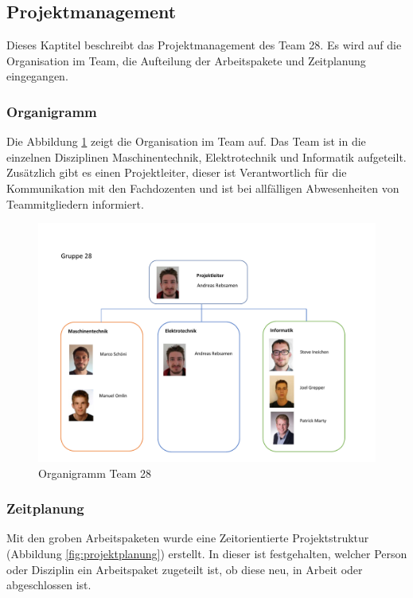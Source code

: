 \documentclass[../../main.tex]{subfiles}
\begin{document}
\subsection{Projektmanagement}
Dieses Kaptitel beschreibt das Projektmanagement des Team 28. Es wird auf die Organisation im Team, die Aufteilung der Arbeitspakete und Zeitplanung eingegangen.

\subsubsection{Organigramm}
Die Abbildung \ref{fig:organigramm} zeigt die Organisation im Team auf. Das Team ist in die einzelnen Disziplinen Maschinentechnik, Elektrotechnik und Informatik aufgeteilt. Zusätzlich gibt es einen Projektleiter, dieser ist Verantwortlich für die Kommunikation mit den Fachdozenten und ist bei allfälligen Abwesenheiten von Teammitgliedern informiert.


\begin{figure}[H] \centering
    \includegraphics[page=1,width=.9\textwidth, trim=1cm .5cm 1cm 3.2cm, clip]{Organigramm.pdf}
    \caption{Organigramm Team 28}
    \label{fig:organigramm}
\end{figure}

\subsubsection{Zeitplanung}
Mit den groben Arbeitspaketen wurde eine Zeitorientierte Projektstruktur (Abbildung \ref{fig:projektplanung}) erstellt. In dieser ist festgehalten, welcher Person oder Disziplin ein Arbeitspaket zugeteilt ist, ob diese neu, in Arbeit oder abgeschlossen ist. \\
\end{document}
